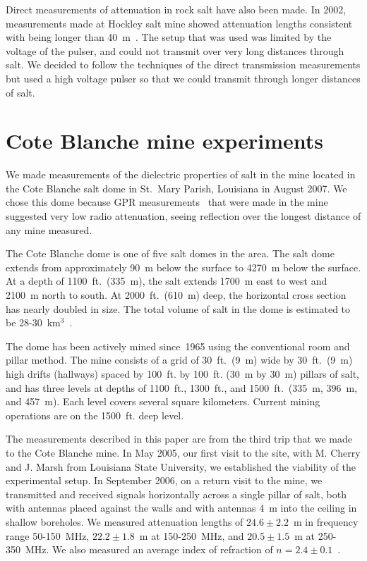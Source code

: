 \documentclass{elsart}
\begin{document}
  Direct measurements of attenuation in rock salt have also been made.  In 2002, measurements made at 
  Hockley salt mine showed attenuation lengths consistent with being longer than 40~m~\cite{hockley}.  
  The setup that was used was limited by the voltage of the pulser, and could not transmit over 
  very long distances through salt.  We decided 
  to follow the techniques of the direct transmission measurements but used a high voltage pulser 
  so that we could transmit through longer distances of salt.  
  
  \section{Cote Blanche mine experiments}
  We made measurements of the dielectric properties of salt in the mine located in the Cote Blanche 
  salt dome in St.~Mary Parish, Louisiana in August 2007.  
  We chose this dome because GPR measurements~\cite{s-unterberger} that were made in the mine
  suggested very low radio attenuation, seeing reflection over the longest 
  distance of any mine measured.  
  
  The Cote Blanche dome is one of five 
  salt domes in the area.  The salt dome extends from approximately 90~m below the 
  surface to 4270~m below the surface.  At a depth of 1100~ft.~(335~m), the salt 
  extends 1700~m east to west and 2100~m north to south.  At 2000~ft.~(610~m) deep, 
  the horizontal cross section has nearly doubled in size.   The total volume of 
  salt in the dome is estimated to be 28-30~km$^3$~\cite{halbouty, cherryelog, davidw}.
  
  The dome has been actively mined since~1965 using the 
  conventional room and pillar method.  The mine consists of a grid of 30~ft.~(9~m) 
  wide by 30~ft.~(9~m) high drifts (hallways) spaced by 100~ft. by 100~ft. (30~m by 30~m)
  pillars of salt, and has three levels at depths of 1100~ft., 1300~ft., 
  and 1500~ft.~(335~m, 396~m, and 457~m).  Each level covers 
  several square kilometers.  Current mining operations are on the 1500~ft. deep level.  
  
  The measurements described in this paper are from the third trip that we made to the Cote 
  Blanche mine.  In May 2005, our first visit to the site, with 
  M. Cherry and J. Marsh from Louisiana State University, we 
  established the viability of the experimental setup\cite{firstvisit}.  
  In September 2006, on a return visit to the mine, we transmitted and 
  received signals horizontally across a 
  single pillar of salt, both with antennas placed against the walls 
  and with antennas 4~m into the ceiling in shallow boreholes.  
  We measured attenuation lengths 
  of $24.6\pm2.2$~m in frequency range 50-150~MHz, 
  $22.2\pm1.8$~m at 150-250~MHz, 
  and $20.5\pm1.5$~m 
  at 250-350~MHz.  We also measured an average index of 
  refraction of $n=2.4\pm0.1$~\cite{secondvisit}.  
  
\end{document}
